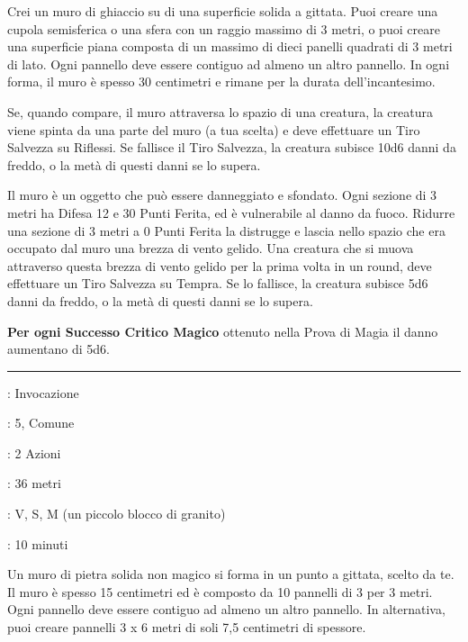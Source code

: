 \begin{multicols}{2}
Crei un muro di ghiaccio su di una superficie solida a gittata. Puoi creare una cupola semisferica o una sfera con un raggio massimo di 3 metri, o puoi creare una superficie piana composta di un massimo di dieci panelli quadrati di 3 metri di lato. Ogni pannello deve essere contiguo ad almeno un altro pannello. In ogni forma, il muro è spesso 30 centimetri e rimane per la durata dell'incantesimo.

Se, quando compare, il muro attraversa lo spazio di una creatura, la creatura viene spinta da una parte del muro (a tua scelta) e deve effettuare un Tiro Salvezza su Riflessi. Se fallisce il Tiro Salvezza, la creatura subisce 10d6 danni da freddo, o la metà di questi danni se lo supera.

Il muro è un oggetto che può essere danneggiato e sfondato. Ogni sezione di 3 metri ha Difesa 12 e 30 Punti Ferita, ed è vulnerabile al danno da fuoco. Ridurre una sezione di 3 metri a 0 Punti Ferita la distrugge e lascia nello spazio che era occupato dal muro una brezza di vento gelido. Una creatura che si muova attraverso questa brezza di vento gelido per la prima volta in un round, deve effettuare un Tiro Salvezza su Tempra. Se lo fallisce, la creatura subisce 5d6 danni da freddo, o la metà di questi danni se lo supera.

\textbf{Per ogni Successo Critico Magico} ottenuto nella Prova di Magia il danno aumentano di 5d6.

\smallskip\noindent\rule{\linewidth}{2pt} \hypertarget{Muro di Pietra}{}\medskip{}
\noindent
\begin{description}[noitemsep, topsep=0pt, parsep=0pt, partopsep=0pt, leftmargin=0cm, labelwidth=2.8cm]
	\item[\textbf{Lista di Magia}]: Invocazione
	\item[\textbf{Livello}]: 5, Comune
	\item[\textbf{T. di Lancio}]: 2 Azioni
	\item[\textbf{Gittata}]: 36 metri
	\item[\textbf{Componenti}]: V, S, M (un piccolo blocco di granito)
	\item[\textbf{Durata}]: 10 minuti
\end{description}

Un muro di pietra solida non magico si forma in un punto a gittata, scelto da te. Il muro è spesso 15 centimetri ed è composto da 10 pannelli di 3 per 3 metri. Ogni pannello deve essere contiguo ad almeno un altro pannello. In alternativa, puoi creare pannelli 3 x 6 metri di soli 7,5 centimetri di spessore.


\end{multicols}
